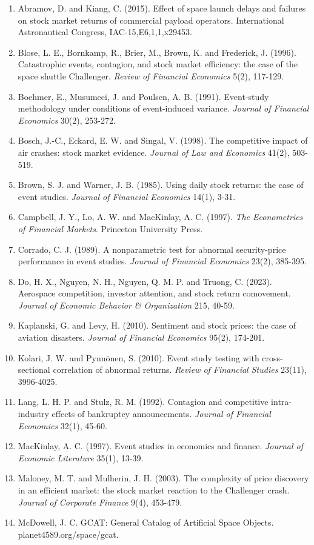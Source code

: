 \documentclass[12pt,a4paper]{article}
\begin{document}
\begin{enumerate}[leftmargin=*,itemsep=2pt,topsep=4pt]
  \item Abramov, D. and Kiang, C. (2015). Effect of space launch delays and failures on stock market returns of commercial payload operators. International Astronautical Congress, IAC-15,E6,1,1,x29453.
  \item Blose, L. E., Bornkamp, R., Brier, M., Brown, K. and Frederick, J. (1996). Catastrophic events, contagion, and stock market efficiency: the case of the space shuttle Challenger. \emph{Review of Financial Economics} 5(2), 117-129.
  \item Boehmer, E., Musumeci, J. and Poulsen, A. B. (1991). Event-study methodology under conditions of event-induced variance. \emph{Journal of Financial Economics} 30(2), 253-272.
  \item Bosch, J.-C., Eckard, E. W. and Singal, V. (1998). The competitive impact of air crashes: stock market evidence. \emph{Journal of Law and Economics} 41(2), 503-519.
  \item Brown, S. J. and Warner, J. B. (1985). Using daily stock returns: the case of event studies. \emph{Journal of Financial Economics} 14(1), 3-31.
  \item Campbell, J. Y., Lo, A. W. and MacKinlay, A. C. (1997). \emph{The Econometrics of Financial Markets}. Princeton University Press.
  \item Corrado, C. J. (1989). A nonparametric test for abnormal security-price performance in event studies. \emph{Journal of Financial Economics} 23(2), 385-395.
  \item Do, H. X., Nguyen, N. H., Nguyen, Q. M. P. and Truong, C. (2023). Aerospace competition, investor attention, and stock return comovement. \emph{Journal of Economic Behavior \& Organization} 215, 40-59.
  \item Kaplanski, G. and Levy, H. (2010). Sentiment and stock prices: the case of aviation disasters. \emph{Journal of Financial Economics} 95(2), 174-201.
  \item Kolari, J. W. and Pynnönen, S. (2010). Event study testing with cross-sectional correlation of abnormal returns. \emph{Review of Financial Studies} 23(11), 3996-4025.
  \item Lang, L. H. P. and Stulz, R. M. (1992). Contagion and competitive intra-industry effects of bankruptcy announcements. \emph{Journal of Financial Economics} 32(1), 45-60.
  \item MacKinlay, A. C. (1997). Event studies in economics and finance. \emph{Journal of Economic Literature} 35(1), 13-39.
  \item Maloney, M. T. and Mulherin, J. H. (2003). The complexity of price discovery in an efficient market: the stock market reaction to the Challenger crash. \emph{Journal of Corporate Finance} 9(4), 453-479.
  \item McDowell, J. C. GCAT: General Catalog of Artificial Space Objects. planet4589.org/space/gcat.
\end{enumerate}
\end{document}
